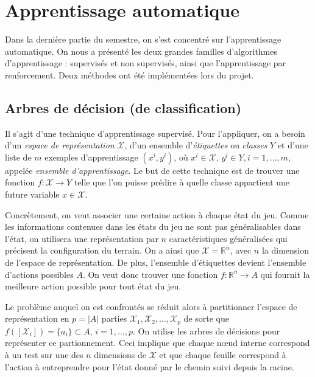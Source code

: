 \documentclass[12pt,a4paper]{article}
\begin{document}
\section{Apprentissage automatique}
Dans la derni\`ere partie du semestre, on s'est concentr\'e sur l'apprentissage 
automatique. On nous a pr\'esent\'e les deux grandes familles 
d'algorithmes d'apprentissage : supervis\'es et non supervis\'es, ainsi que 
l'apprentissage par renforcement. Deux m\'ethodes ont \'et\'e impl\'ement\'ees 
lors du projet.

\subsection*{Arbres de d\'ecision (de classification)}
Il s'agit d'une technique d'apprentissage supervis\'e. Pour l'appliquer, on 
a besoin d'un {\itshape espace de repr\'esentation} $\mathcal{X}$, d'un 
ensemble d'{\itshape \'etiquettes} ou {\itshape classes} $Y$ et d'une liste de 
$m$ exemples d'apprentissage $(x^i,y^i)$, o\`u $x^i \in \mathcal{X}$, $y^i \in 
Y, i = 1,\dotsc,m$, appel\'ee {\itshape ensemble d'apprentissage}.
Le but de cette technique est de trouver une fonction $f: \mathcal{X} \to 
Y$ telle que l'on puisse pr\'edire \`a quelle classe appartient une 
future variable $x \in \mathcal{X}$.

Concr\`etement, on veut associer une certaine action \`a chaque \'etat du jeu. 
Comme les informations contenues dans les \'etats du jeu ne sont pas 
g\'en\'eralisables dans l'\'etat, on utilisera une repr\'esentation par $n$ 
caract\'eristiques g\'en\'eralis\'ees qui pr\'ecisent la configuration du 
terrain. On a ainsi que $\mathcal{X} = \mathbb{R}^n$, avec $n$ la dimension de 
l'espace de repr\'esentation. De plus, l'ensemble d'\'etiquettes devient 
l'ensemble d'actions possibles $A$. On veut donc trouver une fonction $f: 
\mathbb{R}^n \to A$ qui fournit la meilleure action possible pour tout \'etat du 
jeu.

Le probl\`eme auquel on est confront\'es se r\'eduit alors \`a 
partitionner l'espace de repr\'esentation en $p=|A|$ parties 
$\mathcal{X}_1,\mathcal{X}_2,\dotsc,\mathcal{X}_p$ de sorte que 
$f([\mathcal{X}_i]) = \{ a_i \} \subset A$, $i = 1,\dotsc,p$. On utilise les 
arbres de d\'ecisions pour repr\'esenter ce partionnement. Ceci 
implique que chaque n\oe ud interne correspond \`a un test sur une des $n$ 
dimensions de $\mathcal{X}$ et que chaque feuille correspond \`a l'action \`a 
entreprendre pour l'\'etat donn\'e par le chemin suivi depuis la racine.
\end{document}
